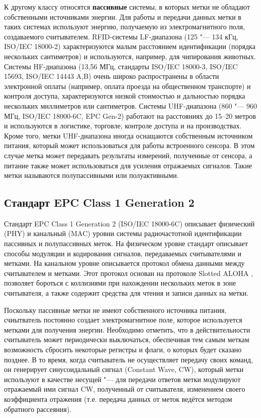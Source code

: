К другому классу относятся \textbf{пассивные} системы, в которых метки не обладают собственными источниками энергии. Для работы и передачи данных метки в таких системах используют энергию, получаемую из электромагнитного поля, создаваемого считывателем. RFID-системы LF-диапазона (125 "--- 134 кГц, ISO/IEC 18000-2) характеризуются малым расстоянием идентификации (порядка нескольких сантиметров) и используются, например, для чипирования животных. Системы HF-диапазона (13,56 МГц, стандарты ISO/IEC 18000-3, ISO/IEC 15693, ISO/IEC 14443 A,B) очень широко распространены в области электронной оплаты (например, оплата проезда на общественном транспорте) и контроля доступа, характеризуются низкой стоимостью и дальностью порядка нескольких миллиметров или сантиметров. Системы UHF-диапазона (860 "--- 960 МГц, ISO/IEC 18000-6C, EPC Gen-2) работают на расстояниях до 15--20 метров и используются в логистике, торговле, контроле доступа и на производствах. Кроме того, метки UHF-диапазона иногда оснащаются собственным источником питания, который может использоваться для работы встроенного сенсора. В этом случае метка может передавать результаты измерений, полученные от сенсора, а питание также может использоваться для усиления отражаемых сигналов. Такие метки называются полупассивными или полуактивными.


\subsection{Стандарт EPC Class 1 Generation 2}

Стандарт EPC Class 1 Generation 2 (ISO/IEC 18000-6C) описывает физический (PHY) и канальный (MAC) уровни системы радиочастотной идентификации пассивных и полупассивных меток. На физическом уровне стандарт описывает способы модуляции и кодирования сигналов, передаваемых считывателями и метками. На канальном уровне описывается протокол обмена данными между считывателем и метками. Этот протокол основан на протоколе Slotted ALOHA \cite{Abramson1970, Roberts1975}, позволяет бороться с коллизиями при нахождении нескольких меток в зоне считывателя, а также содержит средства для чтения и записи данных на метки.

Поскольку пассивные метки не имеют собственного источника питания, счиытватель постоянно создает электромагнитное поле, которое используется метками для получения энергии. Необходимо отметить, что в действительности считыватель может периодически выключаться, обеспечивая тем самым меткам возможность сбросить некоторые регистры и флаги, о которых будет сказано позднее. В то время, когда считыватель не осуществляет передачу своих команд, он генерирует синусоидальный сигнал (Constant Wave, CW), который метки используют в качестве несущей "--- для передачи ответов метки модулируют отражаемый ими сигнал CW, полученный от считывателя, изменением своего коэффициента отражения (т.е. передача данных от меток ведётся методом обратного рассеяния).


